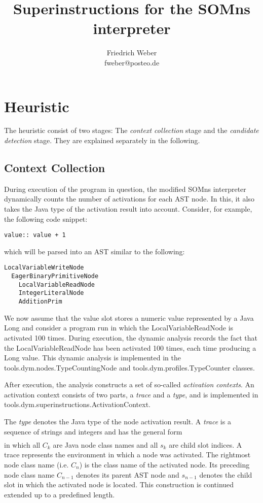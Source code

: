 \documentclass[10pt,a4paper]{article}
\author{Friedrich Weber\\
\small fweber@posteo.de}
\title{Superinstructions for the SOMns interpreter}
\begin{document}
	
\maketitle

\section{Heuristic}

The heuristic consist of two stages: The \emph{context collection} stage and the \emph{candidate detection} stage. They are explained separately in the following.

\subsection{Context Collection}

During execution of the program in question, the modified SOMns interpreter dynamically counts the number of activations for each AST node. In this, it also takes the Java type of the activation result into account. Consider, for example, the following code snippet:
\begin{verbatim}
value:: value + 1
\end{verbatim}
which will be parsed into an AST similar to the following:
\begin{verbatim}
LocalVariableWriteNode
  EagerBinaryPrimitiveNode
    LocalVariableReadNode
    IntegerLiteralNode
    AdditionPrim
\end{verbatim}
We now assume that the \textsf{value} slot stores a numeric value represented by a Java \textsf{Long} and consider a program run in which the \textsf{LocalVariableReadNode} is activated 100 times. During execution, the dynamic analysis records the fact that the \textsf{LocalVariableReadNode} has been activated 100 times, each time producing a \textsf{Long} value. This dynamic analysis is implemented in the \textsf{tools.dym.nodes.TypeCountingNode} and \textsf{tools.dym.profiles.TypeCounter} classes.

After execution, the analysis constructs a set of so-called \emph{activation contexts}. An activation context consists of two parts, a \emph{trace} and a \emph{type}, and is implemented in \textsf{tools.dym.superinstructions.ActivationContext}.

The \emph{type} denotes the Java type of the node activation result. A \emph{trace} is a sequence of strings and integers and has the general form
\begin{align*}
[ C_0, s_0, C_1, ..., s_{n - 1}, C_{n}]
\end{align*}
in which all $C_k$ are Java node class names and all $s_k$ are child slot indices. A trace represents the environment in which a node was activated. The rightmost node class name (i.e. $C_n$) is the class name of the activated node. Its preceding node class name $C_{n-1}$ denotes its parent AST node and $s_{n-1}$ denotes the child slot in which the activated node is located. This construction is continued extended up to a predefined length.
\end{document}
